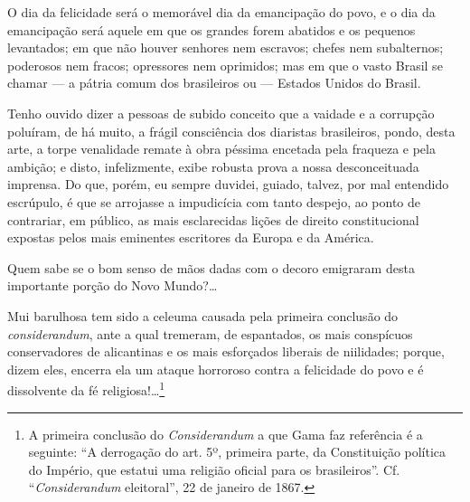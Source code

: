 O dia da felicidade será o memorável dia da emancipação do povo, e o dia
da emancipação será aquele em que os grandes forem abatidos e os
pequenos levantados; em que não houver senhores nem escravos; chefes nem
subalternos; poderosos nem fracos; opressores nem oprimidos; mas em que
o vasto Brasil se chamar --- a pátria comum dos brasileiros ou --- Estados
Unidos do Brasil.

Tenho ouvido dizer a pessoas de subido conceito que a vaidade e a
corrupção poluíram, de há muito, a frágil consciência dos diaristas
brasileiros, pondo, desta arte, a torpe venalidade remate à obra péssima
encetada pela fraqueza e pela ambição; e disto, infelizmente, exibe
robusta prova a nossa desconceituada imprensa. Do que, porém, eu sempre
duvidei, guiado, talvez, por mal entendido escrúpulo, é que se arrojasse
a impudicícia com tanto despejo, ao ponto de contrariar, em público, as
mais esclarecidas lições de direito constitucional expostas pelos mais
eminentes escritores da Europa e da América.

Quem sabe se o bom senso de mãos dadas com o decoro emigraram desta
importante porção do Novo Mundo?\ldots{}

Mui barulhosa tem sido a celeuma causada pela primeira conclusão do
\textit{considerandum}, ante a qual tremeram, de espantados, os mais conspícuos
conservadores de alicantinas e os mais esforçados liberais de
niilidades; porque, dizem eles, encerra ela um ataque horroroso contra a
felicidade do povo e é dissolvente da fé religiosa!\ldots{}\footnote{A
  primeira conclusão do \emph{Considerandum} a que Gama faz referência é a
  seguinte: ``A derrogação do art. 5º, primeira parte, da Constituição
  política do Império, que estatui uma religião oficial para os
  brasileiros''. Cf. ``\emph{Considerandum} eleitoral'', 22 de janeiro de 1867.}

